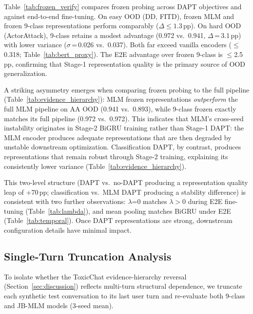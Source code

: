 Table~\ref{tab:frozen_verify} compares frozen probing across DAPT objectives and against end-to-end fine-tuning. On easy OOD (DD, FITD), frozen MLM and frozen 9-class representations perform comparably ($\Delta \leq 1.3$\,pp). On hard OOD (ActorAttack), 9-class retains a modest advantage (0.972 vs.\ 0.941, $\Delta$\,=\,3.1\,pp) with lower variance ($\sigma$\,=\,0.026 vs.\ 0.037). Both far exceed vanilla encoders ($\leq$0.318; Table~\ref{tab:bert_proxy}). The E2E advantage over frozen 9-class is $\leq$2.5\,pp, confirming that Stage-1 representation quality is the primary source of OOD generalization.

A striking asymmetry emerges when comparing frozen probing to the full pipeline (Table~\ref{tab:evidence_hierarchy}): MLM frozen representations \emph{outperform} the full MLM pipeline on AA OOD (0.941 vs.\ 0.893), while 9-class frozen exactly matches its full pipeline (0.972 vs.\ 0.972). This indicates that MLM's cross-seed instability originates in Stage-2 BiGRU training rather than Stage-1 DAPT: the MLM encoder produces adequate representations that are then degraded by unstable downstream optimization. Classification DAPT, by contrast, produces representations that remain robust through Stage-2 training, explaining its consistently lower variance (Table~\ref{tab:evidence_hierarchy}).

This two-level structure (DAPT vs.\ no-DAPT producing a representation quality leap of +70\,pp; classification vs.\ MLM DAPT producing a stability difference) is consistent with two further observations: $\lambda$=0 matches $\lambda > 0$ during E2E fine-tuning (Table~\ref{tab:lambda}), and mean pooling matches BiGRU under E2E (Table~\ref{tab:temporal}). Once DAPT representations are strong, downstream configuration details have minimal impact.

\subsection{Single-Turn Truncation Analysis}
\label{app:truncated}

To isolate whether the ToxicChat evidence-hierarchy reversal (Section~\ref{sec:discussion}) reflects multi-turn structural dependence, we truncate each synthetic test conversation to its last user turn and re-evaluate both 9-class and JB-MLM models (3-seed mean).

